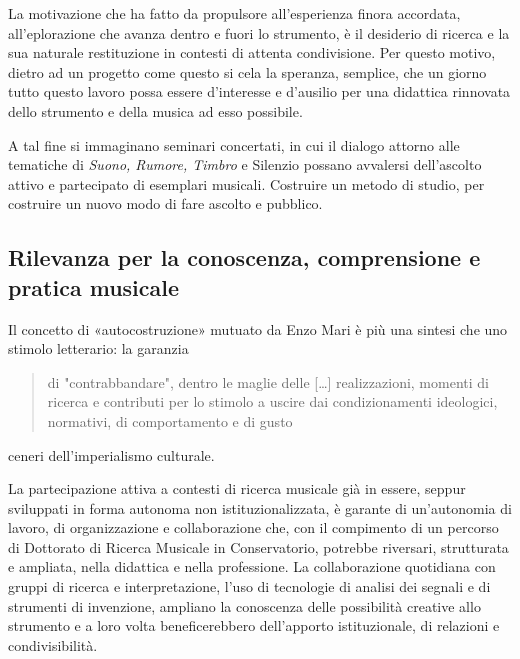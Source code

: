 \documentclass{gs-adonis}
\begin{document}

La motivazione che ha fatto da propulsore all'esperienza finora accordata,
all'eplorazione che avanza dentro e fuori lo strumento, è il desiderio di
ricerca e la sua naturale restituzione in contesti di attenta condivisione. Per
questo motivo, dietro ad un progetto come questo si cela la speranza, semplice,
che un giorno tutto questo lavoro possa essere d'interesse e d'ausilio per una
didattica rinnovata dello strumento e della musica ad esso possibile.

A tal fine si immaginano seminari concertati, in cui il dialogo attorno alle
tematiche di \emph{Suono, Rumore, Timbro} e Silenzio possano avvalersi dell'ascolto
attivo e partecipato di esemplari musicali. Costruire un metodo di studio, per
costruire un nuovo modo di fare ascolto e pubblico.

\subsection{Rilevanza per la conoscenza, comprensione e pratica musicale}



Il concetto di «autocostruzione» mutuato da Enzo Mari \cite{mari2002} è più una
sintesi che uno stimolo letterario: la garanzia

\begin{quote}
  di "contrabbandare", dentro le maglie delle […] realizzazioni, momenti di
  ricerca e contributi per lo stimolo a uscire dai condizionamenti ideologici,
  normativi, di comportamento e di gusto
\end{quote}

ceneri dell'imperialismo culturale.

La partecipazione attiva a contesti di ricerca musicale già in essere, seppur
sviluppati in forma autonoma non istituzionalizzata, è garante di un'autonomia
di lavoro, di organizzazione e collaborazione che, con il compimento di un
percorso di Dottorato di Ricerca Musicale in Conservatorio, potrebbe riversari,
strutturata e ampliata, nella didattica e nella professione. La collaborazione
quotidiana con gruppi di ricerca e interpretazione, l'uso di tecnologie di
analisi dei segnali e di strumenti di invenzione, ampliano la conoscenza
delle possibilità creative allo strumento e a loro volta beneficerebbero
dell'apporto istituzionale, di relazioni e condivisibilità.
\end{document}
